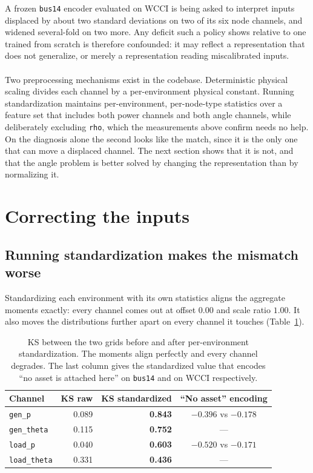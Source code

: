 A frozen \texttt{bus14} encoder evaluated on WCCI is being asked to interpret
inputs displaced by about two standard deviations on two of its six node
channels, and widened several-fold on two more. Any deficit such a policy shows
relative to one trained from scratch is therefore confounded: it may reflect a
representation that does not generalize, or merely a representation reading
miscalibrated inputs.
\\
\\
Two preprocessing mechanisms exist in the codebase. Deterministic physical
scaling divides each channel by a per-environment physical constant. Running
standardization maintains per-environment, per-node-type statistics over a
feature set that includes both power channels and both angle channels, while
deliberately excluding \texttt{rho}, which the measurements above confirm
needs no help. On the diagnosis alone the second looks like the match, since it
is the only one that can move a displaced channel. The next section shows that
it is not, and that the angle problem is better solved by changing the
representation than by normalizing it.


\section{Correcting the inputs}
\label{sec:wcci-correction}

\subsection{Running standardization makes the mismatch worse}
\label{sec:wcci-running-norm}

Standardizing each environment with its own statistics aligns the aggregate
moments exactly: every channel comes out at offset $0.00$ and scale ratio
$1.00$. It also moves the distributions further apart on every channel it
touches (Table~\ref{tab:wcci-running-norm}).

\begin{table}[H]
  \centering
  \small
  \caption{KS between the two grids before and after per-environment
  standardization. The moments align perfectly and every channel degrades. The
  last column gives the standardized value that encodes ``no asset is attached
  here'' on \texttt{bus14} and on WCCI respectively.}
  \label{tab:wcci-running-norm}
  \setlength{\tabcolsep}{8pt}
  \begin{tabular}{lrrc}
    \toprule
    Channel & KS raw & KS standardized & ``No asset'' encoding \\
    \midrule
    \texttt{gen\_p}      & 0.089 & \textbf{0.843} & $-0.396$ vs $-0.178$ \\
    \texttt{gen\_theta}  & 0.115 & \textbf{0.752} & --- \\
    \texttt{load\_p}     & 0.040 & \textbf{0.603} & $-0.520$ vs $-0.171$ \\
    \texttt{load\_theta} & 0.331 & \textbf{0.436} & --- \\
    \bottomrule
  \end{tabular}
\end{table}

